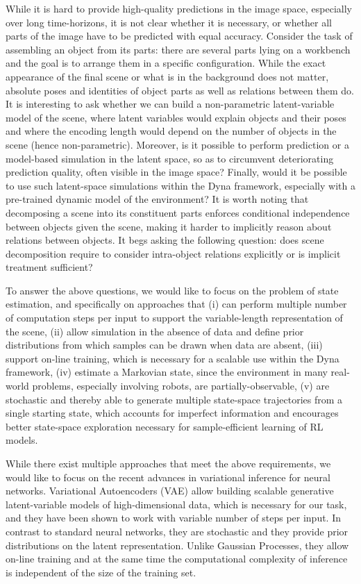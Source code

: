     While it is hard to provide high-quality predictions in the image space, especially over long time-horizons, it is not clear whether it is necessary, or whether all parts of the image have to be predicted with equal accuracy. 
    Consider the task of assembling an object from its parts: 
    there are several parts lying on a workbench and the goal is to arrange them in a specific configuration. 
    While the exact appearance of the final scene or what is in the background does not matter, absolute poses and identities of object parts as well as relations between them do. 
    It is interesting to ask whether we can build a non-parametric latent-variable model of the scene, where latent variables would explain objects and their poses and where the encoding length would depend on the number of objects in the scene (hence non-parametric).
    Moreover, is it possible to perform prediction or a model-based simulation in the latent space, so as to circumvent deteriorating prediction quality, often visible in the image space? 
    Finally, would it be possible to use such latent-space simulations within the Dyna framework, especially with a pre-trained dynamic model of the environment? 
    It is worth noting that decomposing a scene into its constituent parts enforces conditional independence between objects given the scene, making it harder to implicitly reason about relations between objects. 
    It begs asking the following question: does scene decomposition require to consider intra-object relations explicitly or is implicit treatment sufficient?

    To answer the above questions, we would like to focus on the problem of state estimation, and specifically on approaches that 
    (i) can perform multiple number of computation steps per input to support the variable-length representation of the scene, 
    (ii) allow simulation in the absence of data and define prior distributions from which samples can be drawn when data are absent, 
    (iii) support on-line training, which is necessary for a scalable use within the Dyna framework, 
    (iv) estimate a Markovian state, since the environment in many real-world problems, especially involving robots, are partially-observable, 
    (v) are stochastic and thereby able to generate multiple state-space trajectories from a single starting state, which accounts for imperfect information and encourages better state-space exploration necessary for sample-efficient learning of RL models.
    
    While there exist multiple approaches that meet the above requirements, we would like to focus on the recent advances in variational inference for neural networks.
    Variational Autoencoders (VAE) allow building scalable generative latent-variable models of high-dimensional data, which is necessary for our task, and they have been shown to work with variable number of steps per input.  In contrast to standard neural networks, they are stochastic and they provide prior distributions on the latent representation. Unlike Gaussian Processes, they allow on-line training and at the same time the computational complexity of inference is independent of the size of the training set. 

